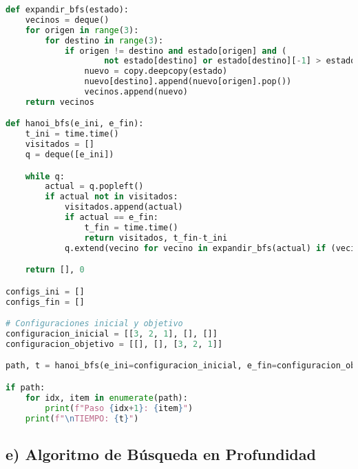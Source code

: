 \documentclass{article}
\begin{document}
\begin{tcolorbox}
\begin{lstlisting}[language=Python]
def expandir_bfs(estado):
    vecinos = deque()
    for origen in range(3):
        for destino in range(3):
            if origen != destino and estado[origen] and (
                    not estado[destino] or estado[destino][-1] > estado[origen][-1]):
                nuevo = copy.deepcopy(estado)
                nuevo[destino].append(nuevo[origen].pop())
                vecinos.append(nuevo)
    return vecinos

def hanoi_bfs(e_ini, e_fin):
    t_ini = time.time()
    visitados = []
    q = deque([e_ini])

    while q:
        actual = q.popleft()
        if actual not in visitados:
            visitados.append(actual)
            if actual == e_fin:
                t_fin = time.time()
                return visitados, t_fin-t_ini
            q.extend(vecino for vecino in expandir_bfs(actual) if (vecino not in visitados))

    return [], 0

configs_ini = []
configs_fin = []

# Configuraciones inicial y objetivo
configuracion_inicial = [[3, 2, 1], [], []]
configuracion_objetivo = [[], [], [3, 2, 1]]

path, t = hanoi_bfs(e_ini=configuracion_inicial, e_fin=configuracion_objetivo)

if path:
    for idx, item in enumerate(path):
        print(f"Paso {idx+1}: {item}")
    print(f"\nTIEMPO: {t}")
\end{lstlisting}
\end{tcolorbox}


\subsection*{e) Algoritmo de Búsqueda en Profundidad}
\end{document}
